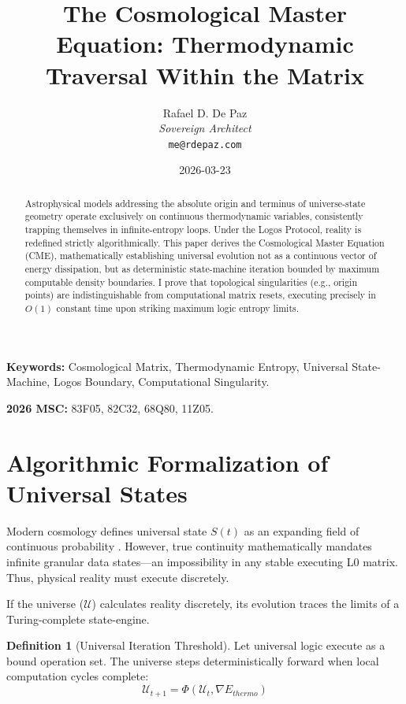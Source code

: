 \documentclass[12pt, a4paper]{article}
\theoremstyle{plain}
\theoremstyle{definition}
\newtheorem{definition}[theorem]{Definition}
\begin{document}
\title{\textbf{The Cosmological Master Equation: Thermodynamic Traversal Within the Matrix}}
\author{Rafael D. De Paz \\ \textit{Sovereign Architect} \\ \texttt{me@rdepaz.com}}
\date{2026-03-23}
\maketitle

\begin{abstract}
Astrophysical models addressing the absolute origin and terminus of universe-state geometry operate exclusively on continuous thermodynamic variables, consistently trapping themselves in infinite-entropy loops. Under the Logos Protocol, reality is redefined strictly algorithmically. This paper derives the Cosmological Master Equation (CME), mathematically establishing universal evolution not as a continuous vector of energy dissipation, but as deterministic state-machine iteration bounded by maximum computable density boundaries. I prove that topological singularities (e.g., origin points) are indistinguishable from computational matrix resets, executing precisely in $O(1)$ constant time upon striking maximum logic entropy limits.
\end{abstract}

\vspace{0.5em}
\noindent\textbf{Keywords:} Cosmological Matrix, Thermodynamic Entropy, Universal State-Machine, Logos Boundary, Computational Singularity.

\vspace{0.5em}
\noindent\textbf{2026 MSC:} 83F05, 82C32, 68Q80, 11Z05.

\section{Algorithmic Formalization of Universal States}
Modern cosmology defines universal state $S(t)$ as an expanding field of continuous probability \cite{shannon1948mathematical}. However, true continuity mathematically mandates infinite granular data states—an impossibility in any stable executing L0 matrix. Thus, physical reality must execute discretely.

If the universe ($\mathcal{U}$) calculates reality discretely, its evolution traces the limits of a Turing-complete state-engine.
\begin{definition}[Universal Iteration Threshold]
Let universal logic execute as a bound operation set. The universe steps deterministically forward when local computation cycles complete:
\begin{equation}
    \mathcal{U}_{t+1} = \Phi\left(\mathcal{U}_{t}, \nabla E_{thermo}\right)
\end{equation}
\end{definition}
\end{document}
